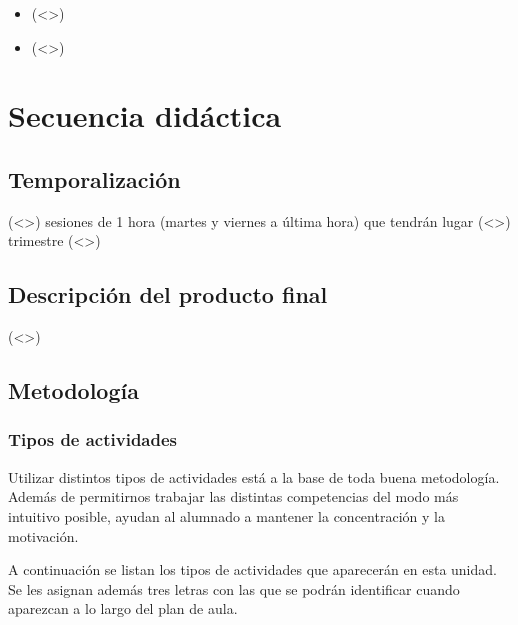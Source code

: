 \documentclass[12pt]{article}
\begin{document}
\singlespace
\begin{itemize}
	\item [(<>))] (<>)
	\item [(<>))] (<>)
\end{itemize}
\onehalfspace

\section{Secuencia didáctica}

\subsection{Temporalización}

(<>) sesiones de 1 hora (martes y viernes a última hora) que tendrán lugar (<>) trimestre (<>)

\subsection{Descripción del producto final}

(<>)

\subsection{Metodología}

\subsubsection{Tipos de actividades}

Utilizar distintos tipos de actividades está a la base de toda buena metodología. Además de permitirnos trabajar las distintas competencias del modo más intuitivo posible, ayudan al alumnado a mantener la concentración y la motivación.

A continuación se listan los tipos de actividades que aparecerán en esta unidad. Se les asignan además tres letras con las que se podrán identificar cuando aparezcan a lo largo del plan de aula.
\end{document}
